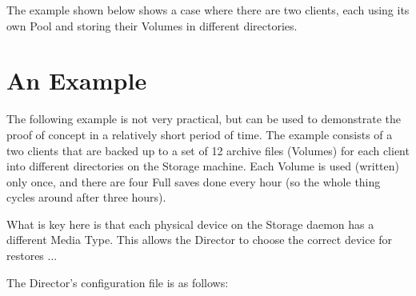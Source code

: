 The example shown below shows a case where there are two clients, each
using its own Pool and storing their Volumes in different directories.


\label{Example2}
\section{An Example}

The following example is not very practical, but can be used to demonstrate
the proof of concept in a relatively short period of time. The example
consists of a two clients that are backed up to a set of 12 archive files
(Volumes) for each client into different directories on the Storage
machine.  Each Volume is used (written) only once, and there are four Full
saves done every hour (so the whole thing cycles around after three hours).

What is key here is that each physical device on the Storage daemon
has a different Media Type. This allows the Director to choose the
correct device for restores ...

The Director's configuration file is as follows:

